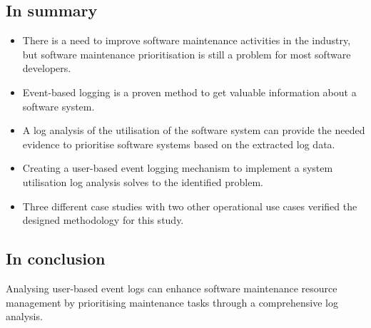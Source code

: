 \subsection{In summary}
\begin{itemize}
	\item There is a need to improve software maintenance activities in the industry, but software maintenance prioritisation is still a problem for most software developers.
	\item Event-based logging is a proven method to get valuable information about a software system.
	\item A log analysis of the utilisation of the software system can provide the needed evidence to prioritise software systems based on the extracted log data.
	\item Creating a user-based event logging mechanism to implement a system utilisation log analysis solves to the identified problem.
	\item Three different case studies with two other operational use cases verified the designed methodology for this study.
\end{itemize}

\subsection{In conclusion}
Analysing user-based event logs can enhance software maintenance resource management by prioritising maintenance tasks through a comprehensive log analysis.